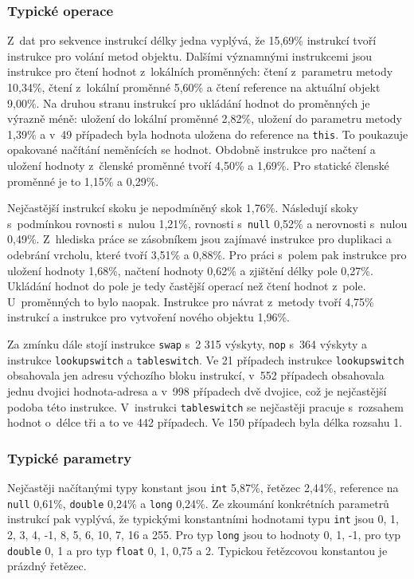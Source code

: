 \subsubsection{Typické operace}

Z~dat pro sekvence instrukcí délky jedna vyplývá, že 15,69\% instrukcí tvoří instrukce pro volání metod objektu. 
Dalšími významnými instrukcemi jsou instrukce pro čtení hodnot z~lokálních proměnných: čtení z~parametru metody 10,34\%, čtení z~lokální proměnné 5,60\% a čtení reference na aktuální objekt 9,00\%. Na druhou stranu instrukcí pro ukládání hodnot do proměnných je výrazně méně: uložení do lokální proměnné 2,82\%, uložení do parametru metody 1,39\% a v~49 případech byla hodnota uložena do reference na \texttt{this}. To poukazuje opakované načítání neměnících se hodnot. Obdobně instrukce pro načtení a uložení hodnoty z~členské proměnné tvoří 4,50\% a 1,69\%. Pro statické členské proměnné je to 1,15\% a 0,29\%. 

Nejčastější instrukcí skoku je nepodmíněný skok 1,76\%. Následují skoky s~podmínkou rovnosti s~nulou 1,21\%, rovnosti s~\texttt{null} 0,52\% a nerovnosti s~nulou 0,49\%. Z~hlediska práce se zásobníkem jsou zajímavé instrukce pro duplikaci a odebrání vrcholu, které tvoří 3,51\% a 0,88\%. Pro práci s~polem pak instrukce pro uložení hodnoty 1,68\%, načtení hodnoty 0,62\% a zjištění délky pole 0,27\%. Ukládání hodnot do pole je tedy častější operací než čtení hodnot z~pole. U~proměnných to bylo naopak. Instrukce pro návrat z~metody tvoří 4,75\% instrukcí a instrukce pro vytvoření nového objektu 1,96\%.

Za zmínku dále stojí instrukce \texttt{swap} s~2 315 výskyty, \texttt{nop} s~364 výskyty a instrukce \texttt{lookupswitch} a \texttt{tableswitch}. Ve 21 případech instrukce \texttt{lookupswitch} obsahovala jen adresu výchozího bloku instrukcí, v~552 případech obsahovala jednu dvojici hodnota-adresa a v~998 případech dvě dvojice, což je nejčastější podoba této instrukce. V~instrukci \texttt{tableswitch} se nejčastěji pracuje s~rozsahem hodnot o~délce tři a to ve 442 případech. Ve 150 případech byla délka rozsahu 1.

\subsubsection{Typické parametry}

Nejčastěji načítanými typy konstant jsou \texttt{int} 5,87\%, řetězec 2,44\%, reference na \texttt{null} 0,61\%, \texttt{double} 0,24\% a \texttt{long} 0,24\%.
Ze zkoumání konkrétních parametrů instrukcí pak vyplývá, že typickými konstantními hodnotami typu \texttt{int} jsou 0, 1, 2, 3, 4, -1, 8, 5, 6, 10, 7, 16 a 255. Pro typ \texttt{long} jsou to hodnoty 0, 1, -1, pro typ \texttt{double} 0, 1 a pro typ \texttt{float} 0, 1, 0,75 a 2. Typickou řetězcovou konstantou je prázdný řetězec. 

